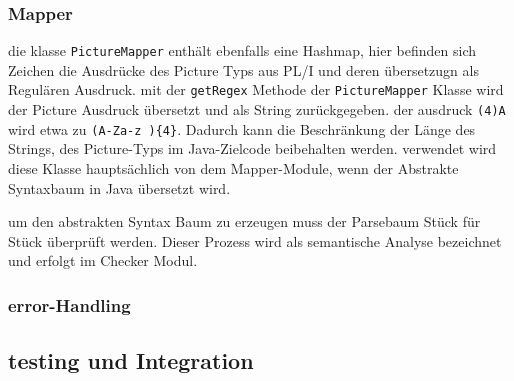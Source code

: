\subsubsection{Mapper}


die klasse \verb+PictureMapper+ enthält ebenfalls eine Hashmap, hier befinden sich Zeichen die Ausdrücke des Picture Typs aus PL/I und deren übersetzugn als Regulären Ausdruck. 
mit der \verb+getRegex+ Methode der \verb+PictureMapper+ Klasse wird der Picture Ausdruck übersetzt und als String zurückgegeben.
der ausdruck \verb+(4)A+ wird etwa zu \verb+(A-Za-z ){4}+. Dadurch kann die Beschränkung der Länge des Strings, des Picture-Typs im Java-Zielcode beibehalten werden. 
verwendet wird diese Klasse hauptsächlich von dem Mapper-Module, wenn der Abstrakte Syntaxbaum in Java übersetzt wird.

um den abstrakten Syntax Baum zu erzeugen muss der Parsebaum Stück für Stück überprüft werden. Dieser Prozess wird als semantische Analyse bezeichnet und erfolgt im Checker Modul.
 



\subsubsection{error-Handling}

\subsection{testing und Integration}




